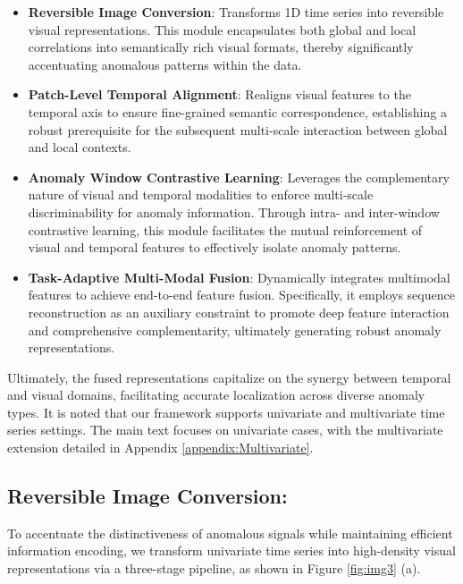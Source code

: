 \documentclass{article}
\theoremstyle{plain}
\theoremstyle{definition}
\theoremstyle{remark}
\begin{document}
\begin{itemize}
    \vspace{-0.5em}
    \item \textbf{Reversible Image Conversion}: Transforms 1D time series into reversible visual representations. This module encapsulates both global and local correlations into semantically rich visual formats, thereby significantly accentuating anomalous patterns within the data.
    \vspace{-0.5em}
    \item \textbf{Patch-Level Temporal Alignment}: Realigns visual features to the temporal axis to ensure fine-grained semantic correspondence, establishing a robust prerequisite for the subsequent multi-scale interaction between global and local contexts.
    \vspace{-0.5em}
    \item \textbf{Anomaly Window Contrastive Learning}: 
    Leverages the complementary nature of visual and temporal modalities to enforce multi-scale discriminability for anomaly information. Through intra- and inter-window contrastive learning, this module facilitates the mutual reinforcement of visual and temporal features to effectively isolate anomaly patterns.
    \vspace{-0.5em}
    \item \textbf{Task-Adaptive Multi-Modal Fusion}: Dynamically integrates multimodal features to achieve end-to-end feature fusion. Specifically, it employs sequence reconstruction as an auxiliary constraint to promote deep feature interaction and comprehensive complementarity, ultimately generating robust anomaly representations. 
\end{itemize}
\vspace{-0.5em}
Ultimately, the fused representations capitalize on the synergy between temporal and visual domains, facilitating accurate localization across diverse anomaly types.
It is noted that our framework supports univariate and multivariate time series settings. The main text focuses on univariate cases, with the multivariate extension detailed in Appendix \ref{appendix:Multivariate}.


\subsection{Reversible Image Conversion:}
To accentuate the distinctiveness of anomalous signals while maintaining efficient information encoding, we transform univariate time series into high-density visual representations via a three-stage pipeline, as shown in Figure \ref{fig:img3} (a). 
\vspace{-0.5em}
\end{document}
